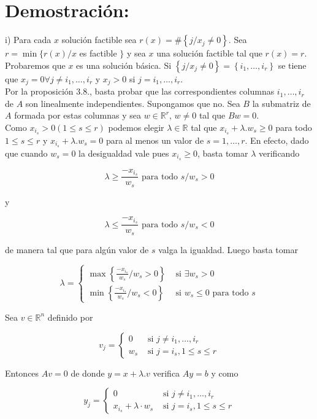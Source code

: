 \documentclass[10pt]{article}
\begin{document}
\section*{Demostración:}
i) Para cada $x$ solución factible sea $r(x)=\#\left\{j / x_{j} \neq 0\right\}$. Sea $r=\min \{r(x) / x$ es factible $\}$ y sea $x$ una solución factible tal que $r(x)=r$. Probaremos que $x$ es una solución básica. Si $\left\{j / x_{j} \neq 0\right\}=\left\{i_{1}, \ldots, i_{r}\right\}$ se tiene que $x_{j}=0 \forall j \neq i_{1}, \ldots, i_{r}$ y $x_{j}>0$ si $j=i_{1}, \ldots, i_{r}$.\\
Por la proposición 3.8., basta probar que las correspondientes columnas $i_{1}, \ldots, i_{r}$ de $A$ son linealmente independientes. Supongamos que no. Sea $B$ la submatriz de $A$ formada por estas columnas y sea $w \in \mathbb{R}^{r}$, $w \neq 0$ tal que $B w=0$.\\
Como $x_{i_{s}}>0(1 \leq s \leq r)$ podemos elegir $\lambda \in \mathbb{R}$ tal que $x_{i_{s}}+\lambda . w_{s} \geq 0$ para todo $1 \leq s \leq r$ y $x_{i_{s}}+\lambda . w_{s}=0$ para al menos un valor de $s=1, \ldots, r$. En efecto, dado que cuando $w_{s}=0$ la desigualdad vale pues $x_{i_{s}} \geq 0$, basta tomar $\lambda$ verificando

$$
\lambda \geq \frac{-x_{i_{s}}}{w_{s}} \text { para todo } s / w_{s}>0
$$

y

$$
\lambda \leq \frac{-x_{i_{s}}}{w_{s}} \text { para todo } s / w_{s}<0
$$

de manera tal que para algún valor de $s$ valga la igualdad. Luego basta tomar

$$
\lambda= \begin{cases}\max \left\{\frac{-x_{i_{s}}}{w_{s}} / w_{s}>0\right\} & \text { si } \exists w_{s}>0 \\ \min \left\{\frac{-x_{i_{s}}}{w_{s}} / w_{s}<0\right\} & \text { si } w_{s} \leq 0 \text { para todo } s\end{cases}
$$

Sea $v \in \mathbb{R}^{n}$ definido por

$$
v_{j}= \begin{cases}0 & \text { si } j \neq i_{1}, \ldots, i_{r} \\ w_{s} & \text { si } j=i_{s}, 1 \leq s \leq r\end{cases}
$$

Entonces $A v=0$ de donde $y=x+\lambda . v$ verifica $A y=b$ y como

$$
y_{j}= \begin{cases}0 & \text { si } j \neq i_{1}, \ldots, i_{r} \\ x_{i_{s}}+\lambda \cdot w_{s} & \text { si } j=i_{s}, 1 \leq s \leq r\end{cases}
$$
\end{document}
